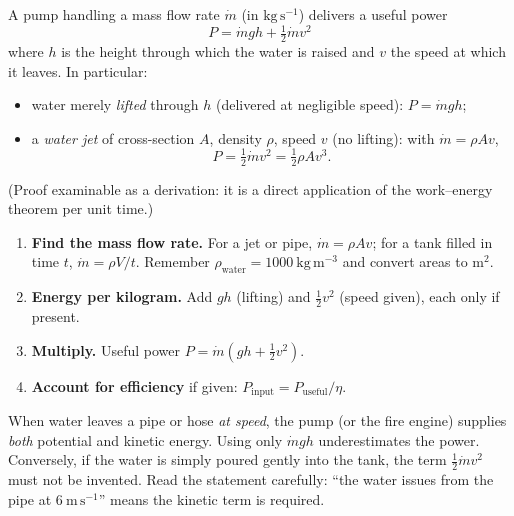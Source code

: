 \documentclass[11pt]{article}
\begin{document}
\begin{propriete}
A pump handling a mass flow rate $\dot{m}$ (in $\mathrm{kg\,s^{-1}}$) delivers a useful power
\[
\boxed{P = \dot{m}gh + \tfrac{1}{2}\dot{m}v^{2}}
\]
where $h$ is the height through which the water is raised and $v$ the speed at which it leaves. In particular:
\begin{itemize}
\item water merely \emph{lifted} through $h$ (delivered at negligible speed): $P = \dot{m}gh$;
\item a \emph{water jet} of cross-section $A$, density $\rho$, speed $v$ (no lifting): with $\dot{m} = \rho A v$,
\[
P = \tfrac{1}{2}\dot{m}v^{2} = \tfrac{1}{2}\rho A v^{3}.
\]
\end{itemize}
(Proof examinable as a derivation: it is a direct application of the work--energy theorem per unit time.)
\end{propriete}

\begin{methode}
\begin{enumerate}
\item \textbf{Find the mass flow rate.} For a jet or pipe, $\dot{m} = \rho A v$; for a tank filled in time $t$, $\dot{m} = \rho V/t$. Remember $\rho_{\text{water}} = 1000\ \mathrm{kg\,m^{-3}}$ and convert areas to $\mathrm{m^{2}}$.
\item \textbf{Energy per kilogram.} Add $gh$ (lifting) and $\tfrac{1}{2}v^{2}$ (speed given), each only if present.
\item \textbf{Multiply.} Useful power $P = \dot{m}\left(gh + \tfrac{1}{2}v^{2}\right)$.
\item \textbf{Account for efficiency} if given: $P_{\text{input}} = P_{\text{useful}}/\eta$.
\end{enumerate}
\end{methode}

\begin{attention}
When water leaves a pipe or hose \emph{at speed}, the pump (or the fire engine) supplies \emph{both} potential and kinetic energy. Using only $\dot{m}gh$ underestimates the power. Conversely, if the water is simply poured gently into the tank, the term $\tfrac{1}{2}\dot{m}v^{2}$ must not be invented. Read the statement carefully: ``the water issues from the pipe at $6\ \mathrm{m\,s^{-1}}$'' means the kinetic term is required.
\end{attention}
\end{document}
